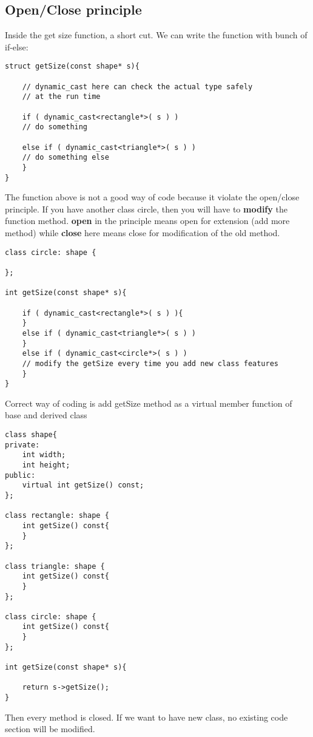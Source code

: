 \documentclass[11pt, oneside]{article}   	%
\begin{document}
\subsection{Open/Close principle}
Inside the get size function, a short cut. We can write the function with bunch of if-else:
\begin{lstlisting}
struct getSize(const shape* s){
	
	// dynamic_cast here can check the actual type safely 
	// at the run time

	if ( dynamic_cast<rectangle*>( s ) )
   	// do something

	else if ( dynamic_cast<triangle*>( s ) )
   	// do something else
	}
}
\end{lstlisting}
The function above is not a good way of code because it violate the open/close principle. If you have another class circle, then you will 
have to \textbf{modify} the function method. \textbf{open} in the principle means open for extension (add more method) while \textbf{close} here means
close for modification of the old method.
\begin{lstlisting}
class circle: shape {

};

int getSize(const shape* s){
	
	if ( dynamic_cast<rectangle*>( s ) ){
	}
	else if ( dynamic_cast<triangle*>( s ) )
	}
	else if ( dynamic_cast<circle*>( s ) )
   	// modify the getSize every time you add new class features
	}
}
\end{lstlisting}
Correct way of coding is add getSize method as a virtual member function of base and derived class
\begin{lstlisting}
class shape{
private:
	int width;
	int height;
public:
	virtual int getSize() const;
};

class rectangle: shape {
	int getSize() const{
	}
};

class triangle: shape {
	int getSize() const{
	}
};

class circle: shape {
	int getSize() const{
	}
};

int getSize(const shape* s){
	
	return s->getSize();
}
\end{lstlisting}
Then every method is closed. If we want to have new class, no existing code section will be modified.
\end{document}
